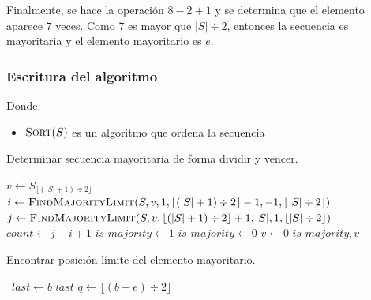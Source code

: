 \documentclass[letter]{article}
\begin{document}
Finalmente, se hace la operación $8-2+1$ y se determina que el elemento aparece $7$ veces. Como $7$ es mayor que $|S| \div 2$, entonces la secuencia es mayoritaria y el elemento mayoritario es $e$. \par

\subsubsection{Escritura del algoritmo} \label{algoritmos:dividir:algoritmo}

Donde:

\begin{itemize}
    \item $\Call{Sort}{S}$ es un algoritmo que ordena la secuencia
\end{itemize}

\begin{algorithm}[!ht]
\caption{Determinar secuencia mayoritaria de forma dividir y vencer.}
\label{alg:dividir}
\begin{algorithmic}[1] 
    \State {} 
    \State $v \leftarrow S_{\lfloor (|S|+1) \div 2 \rfloor}$
    \State $i \leftarrow \Call{FindMajorityLimit}{S,v,1,\lfloor (|S|+1) \div 2 \rfloor-1,-1,\lfloor |S| \div 2 \rfloor}$
    \State $j \leftarrow \Call{FindMajorityLimit}{S,v,\lfloor (|S|+1) \div 2 \rfloor+1,|S|,1,\lfloor |S| \div 2 \rfloor}$
    \State $count \leftarrow j-i+1$
    \State $is\_majority \leftarrow 1$
        \State $is\_majority \leftarrow 0$
        \State $v \leftarrow 0$
    \EndIf
    \State \Return $is\_majority, v$
\EndProcedure
\end{algorithmic}
\end{algorithm}

\begin{algorithm}[!ht]
\caption{Encontrar posición límite del elemento mayoritario.}
\label{alg:encontrar}
\begin{algorithmic}[1] 
        \
            \State $last \leftarrow b$
        \EndIf
        \State \Return $last$
    \Else
        \State $q \leftarrow \lfloor (b+e) \div 2 \rfloor$
                \State \Return {}
            \Else
                \State \Return {}
            \EndIf
        \Else
                \State \Return {}
            \Else
                \State \Return {}
            \EndIf
        \EndIf
    \EndIf
\EndProcedure
\end{algorithmic}
\end{algorithm}
\end{document}
